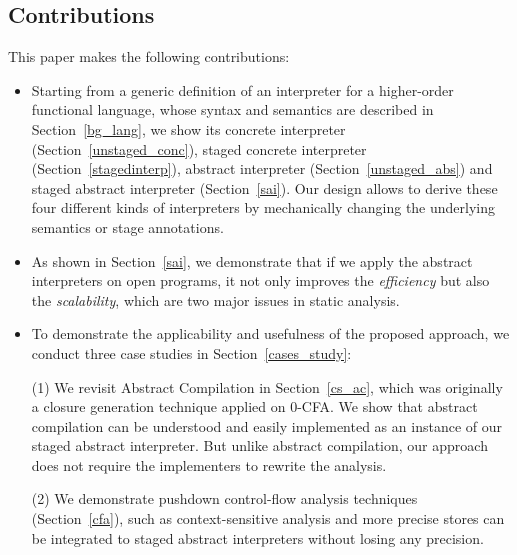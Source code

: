 \iffalse
It has been observed that partially applying context-sensitivity on selected
portion of the program could improve the precision and efficiency
\cite{zipper2018, Kastrinis:2013:HCP:2491956.2462191}. We show that staging
abstract interpreters as an approach to effectively implement hybird
context-sensitivity\todo{}.
\fi

\subsection{Contributions}

This paper makes the following contributions:

\begin{itemize}
  \item Starting from a generic definition of an interpreter for a higher-order
    functional language, whose syntax and semantics are described in
    Section~\ref{bg_lang}, we show its concrete interpreter
    (Section~\ref{unstaged_conc}), staged concrete interpreter
    (Section~\ref{stagedinterp}), abstract interpreter (Section~\ref{unstaged_abs})
    and staged abstract interpreter (Section~\ref{sai}). Our design allows to
    derive these four different kinds of interpreters by mechanically changing the
    underlying semantics or stage annotations.
    
  \item As shown in Section~\ref{sai}, we demonstrate that if we apply the
    abstract interpreters on open programs, it not only improves the
    \textit{efficiency} but also the \textit{scalability}, which are two major
    issues in static analysis.
    
  \item To demonstrate the applicability and usefulness of the proposed
    approach, we conduct three case studies in Section~\ref{cases_study}:
    
    \subitem (1) We revisit Abstract Compilation \cite{Boucher:1996:ACN:647473.727587} in Section~\ref{cs_ac}, 
    which was originally a closure generation technique applied on 0-CFA.
    We show that abstract compilation can be understood and easily implemented
    as an instance of our staged abstract interpreter. But unlike abstract
    compilation, our approach does not require the implementers to rewrite the
    analysis.
    
    \subitem (2) We demonstrate pushdown control-flow analysis techniques
    (Section~\ref{cfa}), such as context-sensitive analysis and more precise
    stores can be integrated to staged abstract interpreters without losing any
    precision. 
    

\end{itemize}
